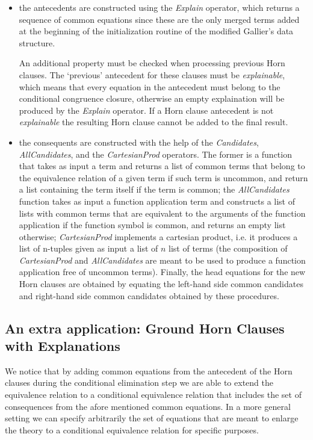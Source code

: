 \begin{itemize}
  \item the antecedents are constructed using the \emph{Explain} operator, 
    which returns a sequence of common equations since these are the 
    only merged terms added at the beginning of the initialization 
    routine of the modified Gallier's data structure.

    An additional property must be checked when processing previous
    Horn clauses. The `previous' antecedent for these clauses must be \emph{explainable},
    which means that every equation in the antecedent must belong to the conditional
    congruence closure, otherwise an empty explaination will be produced by the
    \emph{Explain} operator. If a Horn clause antecedent is not \emph{explainable}
    the resulting Horn clause cannot be added to the final result.

  \item the consequents are constructed with the help of the \emph{Candidates},
    \emph{AllCandidates}, and the \emph{CartesianProd} operators. 
    The former is a function that takes as input
    a term and returns a list of common terms
    that belong to the equivalence relation of a given term if such term is uncommon,
    and return a list containing the term itself if the term is common; the 
    \emph{AllCandidates} function takes as input a function application term and
    constructs a list of lists with common terms that are equivalent to the arguments
    of the function application if the function symbol is common, and returns an empty
    list otherwise; \emph{CartesianProd} implements a cartesian product, i.e. it 
    produces a list of n-tuples given as input a list of $n$ list of terms (the 
      composition of \emph{CartesianProd} and \emph{AllCandidates} are meant to be
    used to produce a function application free of uncommon terms). Finally, the
    head equations for the new Horn clauses are obtained by equating the left-hand
    side common candidates and right-hand side common candidates obtained by these 
    procedures.
\end{itemize}


\subsection{An extra application: Ground Horn Clauses with Explanations}

We notice that by adding common equations
from the antecedent of the Horn clauses during the 
conditional elimination step we are able to 
extend the equivalence relation to a conditional
equivalence relation that includes the set 
of consequences from the afore mentioned common equations.
In a more general setting we can specify arbitrarily the
set of equations that are meant to enlarge the theory
to a conditional equivalence relation for specific purposes.

